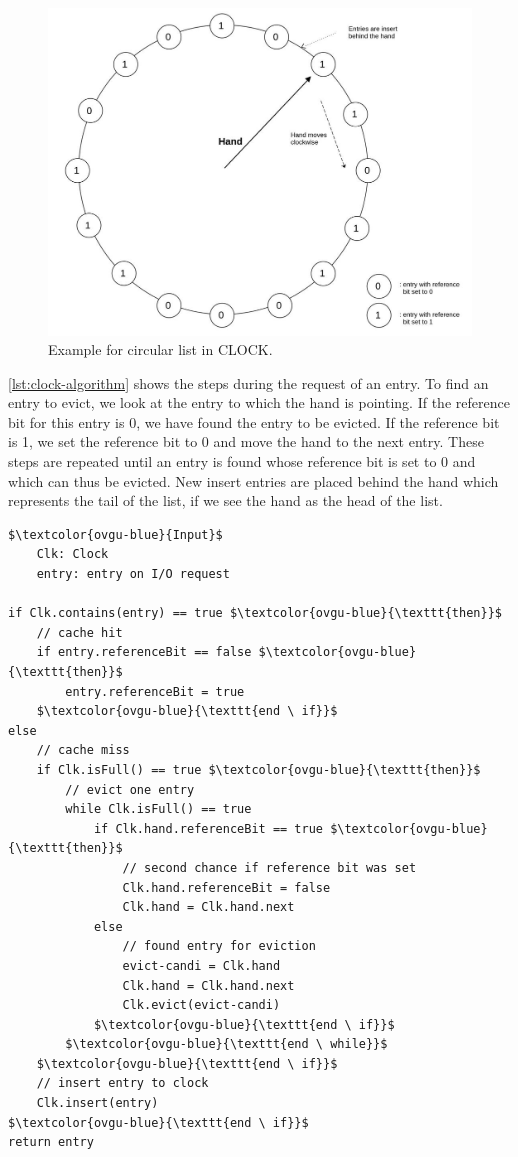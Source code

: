\documentclass[
	12pt,
	a4paper,
	abstract,
	bibliography=totoc,
	chapterprefix,
	headings=openright,
	numbers=endperiod,
	parskip=half,
	twoside,
]{scrreprt}
\begin{document}
\begin{figure}[ht]
	\centering
	\includegraphics[scale=0.4]{clock.jpg}
	\caption{Example for circular list in CLOCK.}
		\label{fig:circular list for CLOCK}
\end{figure}

\cref{lst:clock-algorithm} shows the steps during the request of an entry.
To find an entry to evict, we look at the entry to which the hand is pointing.
If the reference bit for this entry is 0, we have found the entry to be evicted.
If the reference bit is 1, we set the reference bit to 0 and move the hand to the next entry.
These steps are repeated until an entry is found whose reference bit is set to 0 and which can thus be evicted.
New insert entries are placed behind the hand which represents the tail of the list, if we see the hand as the head of the list.

\bigskip
\newpage

\begin{lstlisting}[mathescape=true,caption={CLOCK replacement algorithm in pseudocode.},label=lst:clock-algorithm]
$\textcolor{ovgu-blue}{Input}$
	Clk: Clock
	entry: entry on I/O request

if Clk.contains(entry) == true $\textcolor{ovgu-blue}{\texttt{then}}$
	// cache hit
	if entry.referenceBit == false $\textcolor{ovgu-blue}{\texttt{then}}$
		entry.referenceBit = true
	$\textcolor{ovgu-blue}{\texttt{end \ if}}$
else
	// cache miss
	if Clk.isFull() == true $\textcolor{ovgu-blue}{\texttt{then}}$
		// evict one entry
		while Clk.isFull() == true
			if Clk.hand.referenceBit == true $\textcolor{ovgu-blue}{\texttt{then}}$
				// second chance if reference bit was set
				Clk.hand.referenceBit = false
				Clk.hand = Clk.hand.next
			else
				// found entry for eviction 
				evict-candi = Clk.hand
				Clk.hand = Clk.hand.next
				Clk.evict(evict-candi)
			$\textcolor{ovgu-blue}{\texttt{end \ if}}$
		$\textcolor{ovgu-blue}{\texttt{end \ while}}$
	$\textcolor{ovgu-blue}{\texttt{end \ if}}$
	// insert entry to clock
	Clk.insert(entry)
$\textcolor{ovgu-blue}{\texttt{end \ if}}$	
return entry 
\end{lstlisting}
\end{document}
